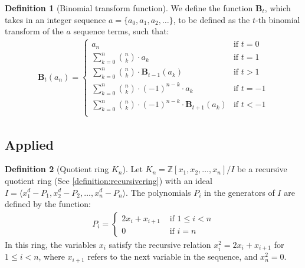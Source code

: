 \documentclass{article}
\theoremstyle{plain}
\theoremstyle{definition}
\newtheorem{definition}{Definition}
\newcommand{\Z}{\mathbb{Z}}
\newcommand{\K}{K}
\newcommand{\BT}{\textbf{B}}
\begin{document}
\begin{definition}[Binomial transform function] \label{definition:binomialtransforms}
We define the function $\BT_t$, which takes in an integer sequence $a = \{ a_0, a_1, a_2, \ldots \}$, to be defined as the $t$-th binomial transform of the $a$ sequence terms, such that:
\begin{align*}
    \BT_{t}(a_n) =
    \begin{cases}
        a_n &\text{if } t = 0 \\
        \sum_{k=0}^{n} \binom{n}{k} \cdot a_k &\text{if } t = 1 \\
        \sum_{k=0}^{n} \binom{n}{k} \cdot \BT_{t-1}(a_k) &\text{if } t > 1 \\
        \sum_{k=0}^{n} \binom{n}{k} \cdot (-1)^{n-k} \cdot a_k  &\text{if } t = -1 \\
        \sum_{k=0}^{n} \binom{n}{k} \cdot (-1)^{n-k} \cdot \BT_{t+1}(a_k) &\text{if } t < -1 \\
    \end{cases}
\end{align*}
\end{definition}

\subsection{Applied}

\begin{definition}[Quotient ring $\K_n$] \label{definition:ring}
Let $\K_n = \Z[x_1, x_2, \ldots, x_n]/I$ be a recursive quotient ring (See \cref{definition:recursivering}) with an ideal \( I = \langle x_1^d - P_1, x_2^d - P_2, \ldots, x_n^d - P_n \rangle \). The polynomials $P_i$ in the generators of $I$ are defined by the function: 
\begin{align}
P_i =
\begin{cases}
    2x_i + x_{i+1} & \text{ if } 1 \leq i < n \\
    0 &\text{ if } i = n
\end{cases}
\end{align}
In this ring, the variables $x_i$ satisfy the recursive relation $x_i^2 = 2x_i + x_{i+1}$ for $1 \leq i < n$, where $x_{i+1}$ refers to the next variable in the sequence, and $x_n^2 = 0$.
\end{definition}
\end{document}
